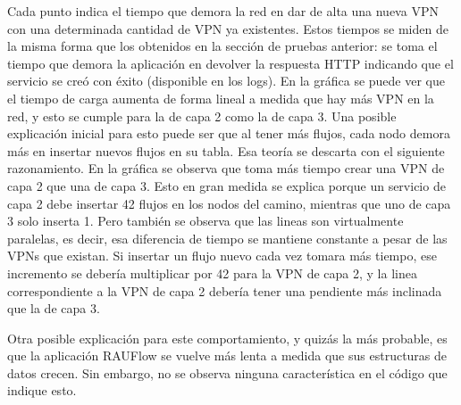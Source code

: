 Cada punto indica el tiempo que demora la red en dar de alta una nueva VPN con una determinada cantidad de VPN ya existentes. Estos tiempos se miden de la misma forma que los obtenidos en la sección de pruebas anterior: se toma el tiempo que demora la aplicación en devolver la respuesta HTTP indicando que el servicio se creó con éxito (disponible en los logs). En la gráfica se puede ver que el tiempo de carga aumenta de forma lineal a medida que hay más VPN en la red, y esto se cumple para la de capa 2 como la de capa 3. Una posible explicación inicial para esto puede ser que al tener más flujos, cada nodo demora más en insertar nuevos flujos en su tabla. Esa teoría se descarta con el siguiente razonamiento. En la gráfica se observa que toma más tiempo crear una VPN de capa 2 que una de capa 3. Esto en gran medida se explica porque un servicio de capa 2 debe insertar 42 flujos en los nodos del camino, mientras que uno de capa 3 solo inserta 1. Pero también se observa que las lineas son virtualmente paralelas, es decir, esa diferencia de tiempo se mantiene constante a pesar de las VPNs que existan. Si insertar un flujo nuevo cada vez tomara más tiempo, ese incremento se debería multiplicar por 42 para la VPN de capa 2, y la linea correspondiente a la VPN de capa 2 debería tener una pendiente más inclinada que la de capa 3.

Otra posible explicación para este comportamiento, y quizás la más probable, es que la aplicación RAUFlow se vuelve más lenta a medida que sus estructuras de datos crecen. Sin embargo, no se observa ninguna característica en el código que indique esto.
